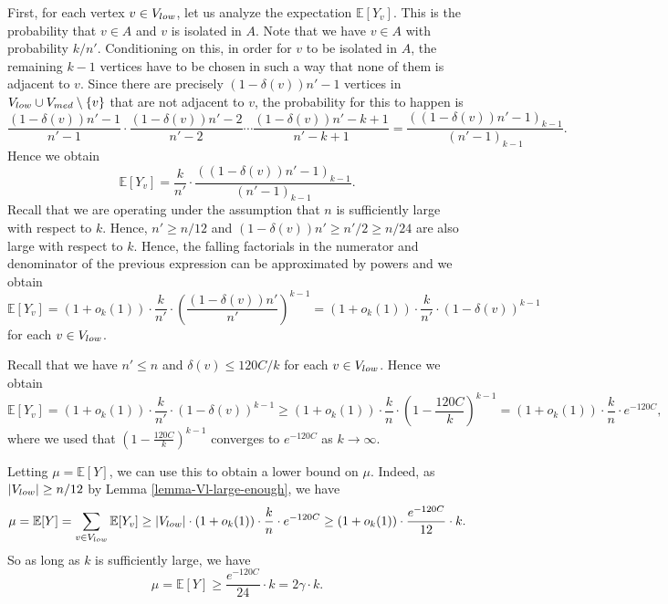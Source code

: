 \documentclass[11pt]{article}
\theoremstyle{definition}
\numberwithin{equation}{section}
\begin{document}
First, for each vertex $v\in V_{\textnormal{low}}$, let us analyze the expectation $\mathbb{E}[Y_v]$. This is the probability that $v\in A$ and $v$ is isolated in $A$. Note that we have $v\in A$ with probability $k/n'$. Conditioning on this, in order for $v$ to be isolated in $A$, the remaining $k-1$ vertices have to be chosen in such a way that none of them is adjacent to $v$. Since there are precisely $(1-\delta(v))n'-1$ vertices in $V_{\textnormal{low}}\cup V_{\textnormal{med}}\setminus \lbrace v\rbrace$ that are not adjacent to $v$, the probability for this to happen is
\[\frac{(1-\delta(v))n'-1}{n'-1}\cdot \frac{(1-\delta(v))n'-2}{n'-2}\dotsm \frac{(1-\delta(v))n'-k+1}{n'-k+1}=\frac{((1-\delta(v))n'-1)_{k-1}}{(n'-1)_{k-1}}.\]
Hence we obtain
\[\mathbb{E}[Y_v]=\frac{k}{n'}\cdot \frac{((1-\delta(v))n'-1)_{k-1}}{(n'-1)_{k-1}}.\]
Recall that we are operating under the assumption that $n$ is sufficiently large with respect to $k$. Hence, $n'\geq n/12$ and $(1-\delta(v))n'\geq n'/2\geq n/24$ are also large with respect to $k$. Hence, the falling factorials in the numerator and denominator of the previous expression can be approximated by powers and we obtain
\begin{equation}\label{eq-E-Yv}
\mathbb{E}[Y_v]=(1+o_k(1))\cdot \frac{k}{n'}\cdot \left(\frac{(1-\delta(v))n'}{n'}\right)^{k-1}=(1+o_k(1))\cdot \frac{k}{n'}\cdot (1-\delta(v))^{k-1}
\end{equation}
for each $v\in V_{\textnormal{low}}$.

Recall that we have $n'\leq n$ and $\delta(v)\leq 120C/k$ for each $v\in V_{\textnormal{low}}$. Hence we obtain
\[\mathbb{E}[Y_v]=(1+o_k(1))\cdot \frac{k}{n'}\cdot (1-\delta(v))^{k-1}\geq (1+o_k(1))\cdot \frac{k}{n}\cdot \left(1-\frac{120C}{k}\right)^{k-1}=(1+o_k(1))\cdot \frac{k}{n}\cdot e^{-120C},\]
where we used that $\left(1-\frac{120C}{k}\right)^{k-1}$ converges to $e^{-120C}$ as $k\to \infty$.

Letting $\mu=\mathbb{E}[Y]$, we can use this to obtain a lower bound on $\mu$. Indeed, as $\vert V_{\textnormal{low}}\vert\geq n/12$ by Lemma \ref{lemma-Vl-large-enough}, we have
\[\mu=\mathbb{E}[Y]=\sum_{v\in V_{\textnormal{low}}}\mathbb{E}[Y_v]\geq \vert V_{\textnormal{low}}\vert\cdot (1+o_k(1))\cdot \frac{k}{n}\cdot e^{-120C}\geq (1+o_k(1))\cdot \frac{e^{-120C}}{12}\cdot k.\]
So as long as $k$ is sufficiently large, we have
\begin{equation}\label{ineq-mu-lower-bd}
\mu=\mathbb{E}[Y]\geq \frac{e^{-120C}}{24}\cdot k=2\gamma \cdot k.
\end{equation}
\end{document}
